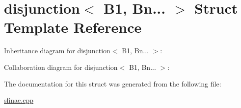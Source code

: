 \hypertarget{structdisjunction_3_01B1_00_01Bn_8_8_8_01_4}{}\section{disjunction$<$ B1, Bn... $>$ Struct Template Reference}
\label{structdisjunction_3_01B1_00_01Bn_8_8_8_01_4}


Inheritance diagram for disjunction$<$ B1, Bn... $>$\+:


Collaboration diagram for disjunction$<$ B1, Bn... $>$\+:


The documentation for this struct was generated from the following file\+:\begin{DoxyCompactItemize}
\item 
\hyperlink{sfinae_8cpp}{sfinae.\+cpp}\end{DoxyCompactItemize}
